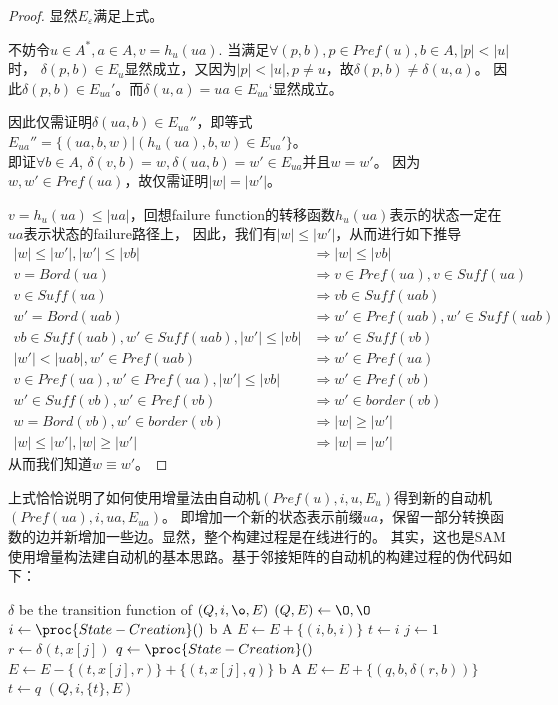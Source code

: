 \documentclass[UTF8]{ctexart}
\theoremstyle{definition}
\theoremstyle{remark}
\numberwithin{equation}{subsection}
\newcommand{\Suff}{\textit{Suff}}
\begin{document}
	\begin{proof}
		显然$E_\varepsilon$满足上式。
		
		不妨令$u \in A^*, a \in A, v = h_u(ua)$.
		当满足$\forall (p,b), p \in Pref(u), b \in A, |p|<|u|$时，
		$\delta(p,b) \in E_u$显然成立，又因为$|p| < |u|, p \neq u$，故$\delta(p,b) \neq \delta(u,a)$。
		因此$\delta(p,b) \in E_{ua}'$。而$\delta(u,a) = ua \in E_{ua}‘$显然成立。
		
		因此仅需证明$\delta(ua,b) \in E_{ua}''$，即等式$E_{ua}'' = \{ (ua,b,w) | (h_u(ua), b, w) \in E_{ua}' \}$。\\
		即证$\forall b \in A$, $\delta(v,b)=w,\delta(ua,b)=w' \in E_{ua}$并且$w = w'$。
		因为$w,w' \in Pref(ua)$，故仅需证明$|w| = |w'|$。
		
		$v = h_u(ua) \le |ua|$，回想failure function的转移函数$h_u(ua)$表示的状态一定在$ua$表示状态的failure路径上，
		因此，我们有$|w| \le |w'|$，从而进行如下推导
		\begin{align*}
			|w| \le |w'|, |w'| \le |vb| 	&\Rightarrow 	|w| \le |vb|			\\
			v = Bord(ua)					&\Rightarrow	v \in Pref(ua), v \in \Suff(ua)	\\
			v \in \Suff(ua) 					&\Rightarrow 	vb \in \Suff(uab)	\\
			w' = Bord(uab) 				&\Rightarrow 	w' \in Pref(uab), w' \in \Suff(uab)	\\
			vb \in \Suff(uab), w' \in \Suff(uab), |w'| \le |vb| &\Rightarrow w' \in \Suff(vb)	\\
			|w'| < |uab|, w' \in Pref(uab)	&\Rightarrow	w' \in Pref(ua)		\\
			v \in Pref(ua), w' \in Pref(ua), |w'| \le |vb|	&\Rightarrow w' \in Pref(vb)	\\
			w' \in \Suff(vb), w' \in Pref(vb) &\Rightarrow 	w' \in border(vb)	\\
			w = Bord(vb), w' \in border(vb) &\Rightarrow 	|w| \ge |w'|	\\
			|w|\le|w'|, |w|\ge|w'|			&\Rightarrow 	|w| = |w'|
		\end{align*}
		从而我们知道$w \equiv w'$。	
	\end{proof}
	上式恰恰说明了如何使用增量法由自动机$(Pref(u), i, {u}, E_u)$得到新的自动机$(Pref(ua), i, {ua}, E_{ua})$。
	即增加一个新的状态表示前缀$ua$，保留一部分转换函数的边并新增加一些边。显然，整个构建过程是在线进行的。
	其实，这也是SAM使用增量构法建自动机的基本思路。基于邻接矩阵的自动机的构建过程的伪代码如下：
	\begin{codebox}
	\zi \Comment $\delta$ be the transition function of $(Q, i, {\o}, E)$
	\li	$(Q, E) \gets {{\O}, {\O}}$
	\li $i \gets \proc{State-Creation}()$
	\li \For b  A
	\li		\Do $E \gets E + \{(i, b, i)\}$
			\End
	\li $t \gets i$
	\li \For $j \gets 1$ \To {}
	\li		\Do
				$r \gets \delta(t, x[j])$
	\li			$q \gets \proc{State-Creation}()$
	\li			$E \gets E - \{(t, x[j], r)\} + \{(t, x[j], q)\}$
	\li			\For b  A
	\li				\Do $E \gets E + \{(q, b, \delta(r, b))\}$
					\End
	\li			$t \gets q$
			\End
	\li \Return $(Q, i, \{t\}, E)$
	\end{codebox}
	
\end{document}
